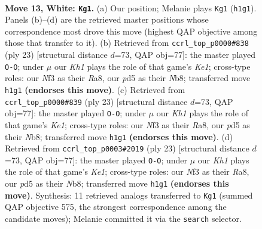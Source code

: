 \documentclass[11pt]{article}
\begin{document}
\clearpage

\begin{figure}[p]\centering
\begin{subfigure}{0.46\textwidth}\centering
\resizebox{\linewidth}{!}{%
\newchessgame
\chessboard[
  setfen={r1b1k2r/2p1qpp1/2n2n2/p2p3p/p2P4/2B2NP1/1P2PPBP/R2Q1R1K w kq - 0 13},
  showmover=false,
  pgfstyle=straightmove, color=movearrow, markmove={h1-g1}
]}
\caption{}
\end{subfigure}\hfill
\begin{subfigure}{0.46\textwidth}\centering
\resizebox{\linewidth}{!}{%
\newchessgame
\chessboard[
  setfen={rn1qk2r/1b2bppp/p2p1n2/P1pP4/2B5/2N2N2/1P3PPP/R1BQK2R b KQkq - 4 12},
  showmover=false,
  pgfstyle=straightmove, color=movearrow, markmove={e8-g8}
]}
\caption{}
\end{subfigure}
\\[4pt]
\begin{subfigure}{0.46\textwidth}\centering
\resizebox{\linewidth}{!}{%
\newchessgame
\chessboard[
  setfen={rn1qk2r/1b2bppp/p2p1n2/P1pP4/2B5/2N2N2/1P3PPP/R1BQK2R b KQkq - 4 12},
  showmover=false,
  pgfstyle=straightmove, color=movearrow, markmove={e8-g8}
]}
\caption{}
\end{subfigure}\hfill
\begin{subfigure}{0.46\textwidth}\centering
\resizebox{\linewidth}{!}{%
\newchessgame
\chessboard[
  setfen={rn1qk2r/1b2bppp/p2p1n2/P1pP4/2B5/2N2N2/1P3PPP/R1BQK2R b KQkq - 4 12},
  showmover=false,
  pgfstyle=straightmove, color=movearrow, markmove={e8-g8}
]}
\caption{}
\end{subfigure}
\caption{\textbf{Move 13, White: \texttt{Kg1}.} (a) Our position; Melanie plays \texttt{Kg1} (\texttt{h1g1}). Panels (b)--(d) are the retrieved master positions whose correspondence most drove this move (highest QAP objective among those that transfer to it). (b) Retrieved from \texttt{ccrl\_top\_p0000\#838} (ply 23) [structural distance $d$=73, QAP obj=77]: the master played \texttt{O-O}; under $\mu$ our \emph{Kh1} plays the role of that game's \emph{Ke1}; cross-type roles: our \emph{N}f3 as their \emph{R}a8, our \emph{p}d5 as their \emph{N}b8; transferred move \texttt{h1g1} \textbf{(endorses this move)}. (c) Retrieved from \texttt{ccrl\_top\_p0000\#839} (ply 23) [structural distance $d$=73, QAP obj=77]: the master played \texttt{O-O}; under $\mu$ our \emph{Kh1} plays the role of that game's \emph{Ke1}; cross-type roles: our \emph{N}f3 as their \emph{R}a8, our \emph{p}d5 as their \emph{N}b8; transferred move \texttt{h1g1} \textbf{(endorses this move)}. (d) Retrieved from \texttt{ccrl\_top\_p0003\#2019} (ply 23) [structural distance $d$=73, QAP obj=77]: the master played \texttt{O-O}; under $\mu$ our \emph{Kh1} plays the role of that game's \emph{Ke1}; cross-type roles: our \emph{N}f3 as their \emph{R}a8, our \emph{p}d5 as their \emph{N}b8; transferred move \texttt{h1g1} \textbf{(endorses this move)}. Synthesis: 11 retrieved analogs transferred to \texttt{Kg1} (summed QAP objective 575, the strongest correspondence among the candidate moves); Melanie committed it via the \texttt{search} selector.}
\label{fig:thought-m24}
\end{figure}
\end{document}
